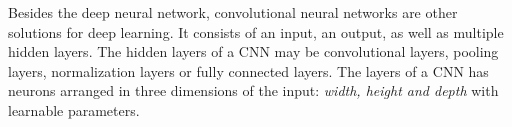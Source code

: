 Besides the deep neural network, convolutional neural networks are other solutions for deep learning. It consists of an input, an output, as well as multiple hidden layers. The hidden layers of a CNN may be convolutional layers, pooling layers, normalization layers or fully connected layers. The layers of a CNN has neurons arranged in three dimensions of the input: \textit{width, height and depth} with learnable parameters.